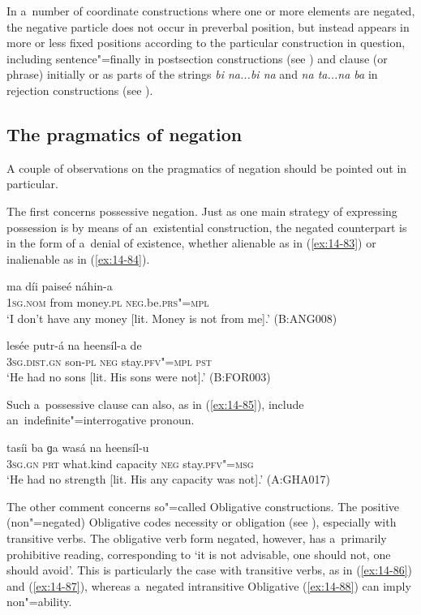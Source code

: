 In a~number of coordinate constructions where one or more elements are negated, the negative particle does not occur in preverbal position, but instead appears in more or less fixed positions according to the particular construction in question, including sentence"=finally in postsection constructions (see ) and clause (or phrase) initially or as parts of the strings \textit{bi na...bi na} and \textit{na ta...na ba} in rejection constructions (see ). 


\subsection{The pragmatics of negation}
\label{subsec:14-3-4}


A couple of observations on the pragmatics of negation should be pointed out in particular.


The first concerns possessive negation. Just as one main strategy of expressing possession is by means of an~existential construction, the negated counterpart is in the form of a~denial of existence, whether alienable as in (\ref{ex:14-83}) or inalienable as in (\ref{ex:14-84}).

\begin{exe}
\ex
\label{ex:14-83}
\gll ma díi paiseé náhin-a \\
\textsc{1sg.nom} from money.\textsc{pl} \textsc{neg}.be.\textsc{prs"=mpl}  \\
\glt `I don't have any money [lit. Money is not from me].' (B:ANG008)

\ex
\label{ex:14-84}
\gll lesée putr-á na heensíl-a de \\
\textsc{3sg.dist.gn} son-\textsc{pl} \textsc{neg} stay.\textsc{pfv"=mpl} \textsc{pst}  \\
\glt `He had no sons [lit. His sons were not].' (B:FOR003)
\end{exe}

Such a~possessive clause can also, as in (\ref{ex:14-85}), include an~indefinite"=interrogative pronoun.

\begin{exe}
\ex
\label{ex:14-85}
\gll tasíi ba ɡa wasá na heensíl-u \\
\textsc{3sg.gn} \textsc{prt} what.kind capacity \textsc{neg} stay.\textsc{pfv"=msg } \\
\glt `He had no strength [lit. His any capacity was not].' (A:GHA017)
\end{exe}

The other comment concerns so"=called Obligative constructions. The positive (non"=negated) Obligative codes necessity or obligation (see ), especially with transitive verbs. The obligative verb form negated, however, has a~primarily prohibitive reading, corresponding to `it is not advisable, one should not, one should avoid'. This is particularly the case with transitive verbs, as in (\ref{ex:14-86}) and (\ref{ex:14-87}), whereas a~negated intransitive Obligative (\ref{ex:14-88}) can imply non"=ability.

